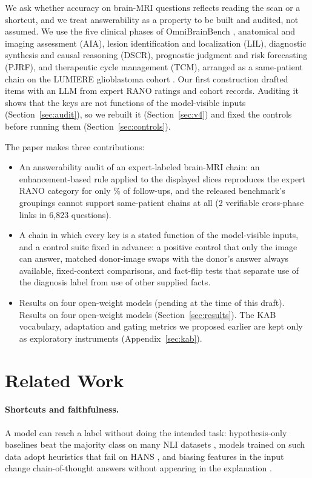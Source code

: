 \documentclass[11pt]{article}
\begin{document}
We ask whether accuracy on brain-MRI questions reflects reading the scan or a shortcut, and we treat answerability as a property to be built and audited, not assumed. We use the five clinical phases of OmniBrainBench \citep{peng2026omnibrainbench}, anatomical and imaging assessment (AIA), lesion identification and localization (LIL), diagnostic synthesis and causal reasoning (DSCR), prognostic judgment and risk forecasting (PJRF), and therapeutic cycle management (TCM), arranged as a same-patient chain on the LUMIERE glioblastoma cohort \citep{suter2022lumiere}. Our first construction drafted items with an LLM from expert RANO ratings and cohort records. Auditing it shows that the keys are not functions of the model-visible inputs (Section~\ref{sec:audit}), so we rebuilt it (Section~\ref{sec:v4}) and fixed the controls before running them (Section~\ref{sec:controls}).

The paper makes three contributions:
\begin{itemize}[leftmargin=*, itemsep=2pt, topsep=2pt]
    \item An answerability audit of an expert-labeled brain-MRI chain: an enhancement-based rule applied to the displayed slices reproduces the expert RANO category for only \vfourConcordantPct{}\% of \vfourFollowups{} follow-ups, and the released benchmark's groupings cannot support same-patient chains at all (2 verifiable cross-phase links in 6,823 questions).
    \item A chain in which every key is a stated function of the model-visible inputs, and a control suite fixed in advance: a positive control that only the image can answer, matched donor-image swaps with the donor's answer always available, fixed-context comparisons, and fact-flip tests that separate use of the diagnosis label from use of other supplied facts.
    \item \ifnum{} Results on four open-weight models (pending at the time of this draft). \else Results on four open-weight models (Section~\ref{sec:results}). \fi The KAB vocabulary, adaptation and gating metrics we proposed earlier are kept only as exploratory instruments (Appendix~\ref{sec:kab}).
\end{itemize}

\section{Related Work}
\label{sec:related-work}

\paragraph{Shortcuts and faithfulness.} A model can reach a label without doing the intended task: hypothesis-only baselines beat the majority class on many NLI datasets \citep{poliak2018hypothesis, gururangan2018annotation}, models trained on such data adopt heuristics that fail on HANS \citep{mccoy2019right}, and biasing features in the input change chain-of-thought answers without appearing in the explanation \citep{turpin2023language}.
\end{document}
